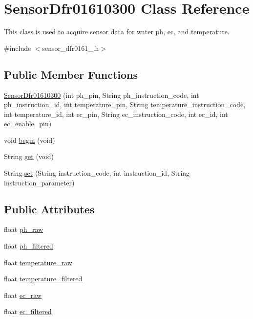 \hypertarget{class_sensor_dfr01610300}{}\section{Sensor\+Dfr01610300 Class Reference}
\label{class_sensor_dfr01610300}


This class is used to acquire sensor data for water ph, ec, and temperature.  




{\ttfamily \#include $<$sensor\+\_\+dfr0161\+\_.\+h$>$}

\subsection*{Public Member Functions}
\begin{DoxyCompactItemize}
\item 
\hyperlink{class_sensor_dfr01610300_aeb40fef336ad2b2d82f7c5eddf9d318e}{Sensor\+Dfr01610300} (int ph\+\_\+pin, String ph\+\_\+instruction\+\_\+code, int ph\+\_\+instruction\+\_\+id, int temperature\+\_\+pin, String temperature\+\_\+instruction\+\_\+code, int temperature\+\_\+id, int ec\+\_\+pin, String ec\+\_\+instruction\+\_\+code, int ec\+\_\+id, int ec\+\_\+enable\+\_\+pin)
\item 
void \hyperlink{class_sensor_dfr01610300_a456221ff4728d8985c8e980d4f22b692}{begin} (void)
\item 
String \hyperlink{class_sensor_dfr01610300_a21bbd0f8ee7e6576eabd9acf0e1e4d89}{get} (void)
\item 
String \hyperlink{class_sensor_dfr01610300_ab675c2708ff9d5d0d9bbe10bab3d97e8}{set} (String instruction\+\_\+code, int instruction\+\_\+id, String instruction\+\_\+parameter)
\end{DoxyCompactItemize}
\subsection*{Public Attributes}
\begin{DoxyCompactItemize}
\item 
float \hyperlink{class_sensor_dfr01610300_aa0ab70c745bde253adaa343afba56473}{ph\+\_\+raw}
\item 
float \hyperlink{class_sensor_dfr01610300_a09ae20cb63d44609c717dda168b8e454}{ph\+\_\+filtered}
\item 
float \hyperlink{class_sensor_dfr01610300_a483485c4c8a91569e8f45819e641e38c}{temperature\+\_\+raw}
\item 
float \hyperlink{class_sensor_dfr01610300_a598f2f18f66d626a3ce392478fcadcc8}{temperature\+\_\+filtered}
\item 
float \hyperlink{class_sensor_dfr01610300_af0fc005c44506d277f792acd29f64c3e}{ec\+\_\+raw}
\item 
float \hyperlink{class_sensor_dfr01610300_a3183d77d8012266006113a3d8647a2a9}{ec\+\_\+filtered}
\end{DoxyCompactItemize}


